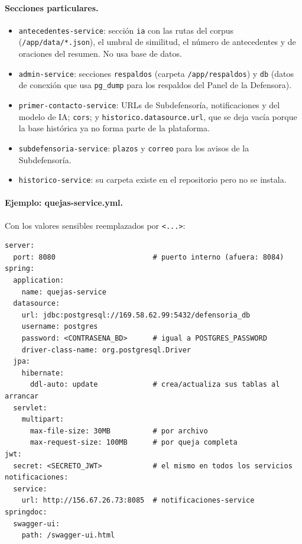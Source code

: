 \paragraph{Secciones particulares.}
\begin{itemize}
  \item \texttt{antecedentes-service}: sección \texttt{ia} con las rutas del corpus (\texttt{/app/data/*.json}), el umbral de similitud, el número de antecedentes y de oraciones del resumen. No usa base de datos.
  \item \texttt{admin-service}: secciones \texttt{respaldos} (carpeta \texttt{/app/respaldos}) y \texttt{db} (datos de conexión que usa \texttt{pg\_dump} para los respaldos del Panel de la Defensora).
  \item \texttt{primer-contacto-service}: URLs de Subdefensoría, notificaciones y del modelo de IA; \texttt{cors}; y \texttt{historico.datasource.url}, que se deja vacía porque la base histórica ya no forma parte de la plataforma.
  \item \texttt{subdefensoria-service}: \texttt{plazos} y \texttt{correo} para los avisos de la Subdefensoría.
  \item \texttt{historico-service}: su carpeta existe en el repositorio pero no se instala.
\end{itemize}

\paragraph{Ejemplo: quejas-service.yml.} Con los valores sensibles reemplazados por \texttt{<...>}:
\begin{lstlisting}
server:
  port: 8080                       # puerto interno (afuera: 8084)
spring:
  application:
    name: quejas-service
  datasource:
    url: jdbc:postgresql://169.58.62.99:5432/defensoria_db
    username: postgres
    password: <CONTRASENA_BD>      # igual a POSTGRES_PASSWORD
    driver-class-name: org.postgresql.Driver
  jpa:
    hibernate:
      ddl-auto: update             # crea/actualiza sus tablas al arrancar
  servlet:
    multipart:
      max-file-size: 30MB          # por archivo
      max-request-size: 100MB      # por queja completa
jwt:
  secret: <SECRETO_JWT>            # el mismo en todos los servicios
notificaciones:
  service:
    url: http://156.67.26.73:8085  # notificaciones-service
springdoc:
  swagger-ui:
    path: /swagger-ui.html
\end{lstlisting}

